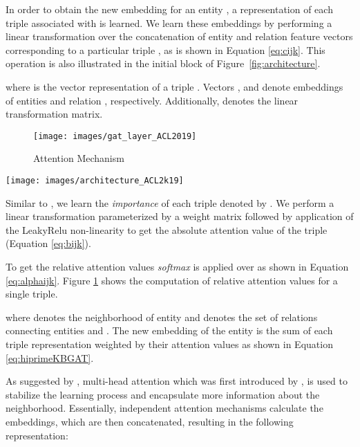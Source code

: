 \documentclass[11pt,a4paper]{article}
\begin{document}
In order to obtain the new embedding for an entity , a representation of each triple associated with  is learned. We learn these embeddings by performing a linear transformation over the concatenation of entity and relation feature vectors corresponding to a particular triple , as is shown in Equation \ref{eq:cijk}. This operation is also illustrated in the initial block of Figure~\ref{fig:architecture}.

where  is the vector representation of a triple . Vectors , and  denote embeddings of entities  and relation , respectively. Additionally,  denotes the linear transformation matrix. \begin{figure}[tbp]
\centering
  \texttt{[image: images/gat\_layer\_ACL2019]}
  \caption{Attention Mechanism}
  \label{fig:layer}
\end{figure}
\begin{figure*}
  \texttt{[image: images/architecture\_ACL2k19]}
  \caption{This figure shows end-to-end architecture of our model. Dashed arrows in the figure represent concatenation operation. Green circles represents initial entity embedding vectors and yellow circles represents initial relation embedding vectors.}
  \label{fig:architecture}
\end{figure*}
Similar to \cite{velickovic2018graph}, we learn the \emph{importance} of each triple  denoted by . 
We perform a linear transformation parameterized by a weight matrix  followed by application of 
the LeakyRelu non-linearity to get the absolute attention value of the triple (Equation \ref{eq:bijk}).

To get the relative attention values \emph{softmax} is applied over  as shown in Equation \ref{eq:alphaijk}. Figure \ref{fig:layer} shows the computation of relative attention values  for a single triple.

where  denotes the neighborhood of entity  and  denotes the set of relations connecting entities  and .
The new embedding of the entity  is the sum of each triple representation weighted by their attention values as shown in Equation \ref{eq:hiprimeKBGAT}.

As suggested by \cite{velickovic2018graph}, multi-head attention which was first introduced by \cite{NIPS2017_7181}, is used to stabilize the learning process and encapsulate more information about the neighborhood. Essentially,  independent attention mechanisms calculate the embeddings, which are then concatenated, resulting in the following representation: 
\end{document}
